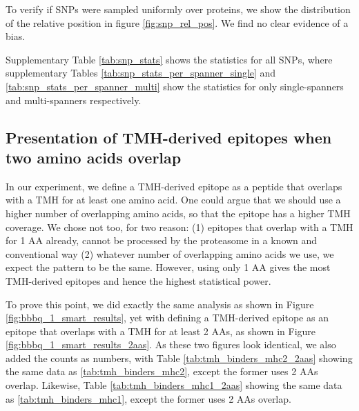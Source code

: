 
To verify if SNPs were sampled uniformly
over proteins, we show the distribution 
of the relative position in figure \ref{fig:snp_rel_pos}.
We find no clear evidence of a bias.


Supplementary Table \ref{tab:snp_stats} shows the statistics for all
SNPs, where supplementary Tables \ref{tab:snp_stats_per_spanner_single}
and \ref{tab:snp_stats_per_spanner_multi} show the
statistics for only single-spanners and multi-spanners respectively.
 






\clearpage

\subsection{Presentation of TMH-derived epitopes when two amino acids overlap}

In our experiment, we define a TMH-derived epitope as a peptide that overlaps
with a TMH for at least one amino acid. 
One could argue that we should use a higher number of overlapping amino acids, so that the epitope has a higher TMH coverage.
We chose not too, for two reason: (1) epitopes that overlap with a TMH
for 1 AA already, cannot be processed by the proteasome in a known and conventional
way (2) whatever number of overlapping amino acids we use, we expect the pattern to be the same.
However, using only 1 AA gives the most TMH-derived epitopes and hence the highest statistical
power.

To prove this point, we did exactly the same analysis 
as shown in Figure \ref{fig:bbbq_1_smart_results},
yet with defining a TMH-derived epitope as an epitope that overlaps with a TMH
for at least 2 AAs, as shown in Figure \ref{fig:bbbq_1_smart_results_2aas}.
As these two figures look identical, 
we also added the counts as numbers,
with Table \ref{tab:tmh_binders_mhc2_2aas} showing the same data
as \ref{tab:tmh_binders_mhc2}, except the former uses 2 AAs overlap.
Likewise, Table \ref{tab:tmh_binders_mhc1_2aas} showing the same data
as \ref{tab:tmh_binders_mhc1}, except the former uses 2 AAs overlap.

